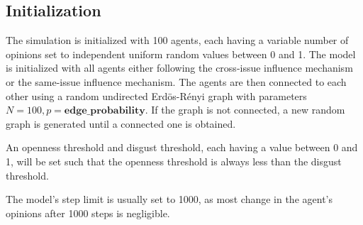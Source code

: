 \subsection{Initialization}

The simulation is initialized with 100 agents, each having a variable number of opinions set to
independent uniform random values between 0 and 1. The model is initialized with all agents either following the cross-issue influence mechanism or the same-issue influence mechanism. The agents are then
connected to each other using a random undirected Erd\"{o}s-R\'{e}nyi
graph\cite{erdos_random_1959} with parameters\ $N=100,
p=\textbf{edge\_probability}$. If the graph is not connected, a new random
graph is generated until a connected one is obtained.

An openness threshold and disgust threshold, each having a value between 0 and 1, will be set such that the openness threshold is always less than the disgust threshold.

The model's step limit is usually set to 1000, as most change in the agent's
opinions after 1000 steps is negligible.

